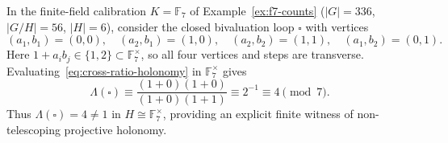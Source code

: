\begin{example}
\label{ex:f7-cross-ratio-holonomy}
In the finite-field calibration $K=\mathbb{F}_7$ of Example~\ref{ex:f7-counts}
($|G|=336$, $|G/H|=56$, $|H|=6$), consider the closed bivaluation loop $\square$
with vertices
\[
  (a_1,b_1)=(0,0), \quad (a_2,b_1)=(1,0), \quad (a_2,b_2)=(1,1), \quad (a_1,b_2)=(0,1).
\]
Here $1+a_i b_j \in \{1,2\}\subset\mathbb{F}_7^\times$, so all four vertices and steps
are transverse. Evaluating~\eqref{eq:cross-ratio-holonomy} in $\mathbb{F}_7^\times$ gives
\[
  \Lambda(\square) \equiv \frac{(1+0)(1+0)}{(1+0)(1+1)} \equiv 2^{-1} \equiv 4 \pmod 7.
\]
Thus $\Lambda(\square)=4\neq 1$ in $H\cong\mathbb{F}_7^\times$, providing an explicit
finite witness of non-telescoping projective holonomy.
\end{example}

